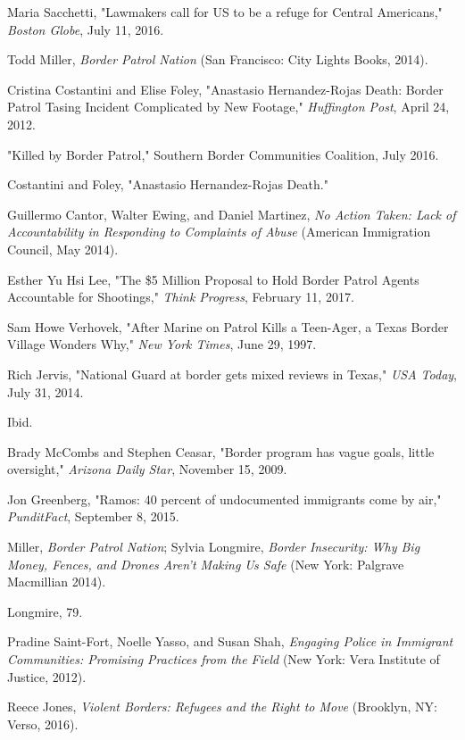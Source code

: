 \documentclass[fontset=fandol, a4paper, 12pt, openright]{ctexbook}
\begin{document}
\begin{enumerate}[label={[\arabic*]}]
    \item Maria Sacchetti, "Lawmakers call for US to be a refuge for Central Americans," \textit{Boston Globe}, July 11, 2016.
    \item Todd Miller, \textit{Border Patrol Nation} (San Francisco: City Lights Books, 2014).
    \item Cristina Costantini and Elise Foley, "Anastasio Hernandez-Rojas Death: Border Patrol Tasing Incident Complicated by New Footage," \textit{Huffington Post}, April 24, 2012.
    \item "Killed by Border Patrol," Southern Border Communities Coalition, July 2016.
    \item Costantini and Foley, "Anastasio Hernandez-Rojas Death."
    \item Guillermo Cantor, Walter Ewing, and Daniel Martinez, \textit{No Action Taken: Lack of Accountability in Responding to Complaints of Abuse} (American Immigration Council, May 2014).
    \item Esther Yu Hsi Lee, "The \$5 Million Proposal to Hold Border Patrol Agents Accountable for Shootings," \textit{Think Progress}, February 11, 2017.
    \item Sam Howe Verhovek, "After Marine on Patrol Kills a Teen-Ager, a Texas Border Village Wonders Why," \textit{New York Times}, June 29, 1997.
    \item Rich Jervis, "National Guard at border gets mixed reviews in Texas," \textit{USA Today}, July 31, 2014.
    \item Ibid.
    \item Brady McCombs and Stephen Ceasar, "Border program has vague goals, little oversight," \textit{Arizona Daily Star}, November 15, 2009.
    \item Jon Greenberg, "Ramos: 40 percent of undocumented immigrants come by air," \textit{PunditFact}, September 8, 2015.
    \item Miller, \textit{Border Patrol Nation}; Sylvia Longmire, \textit{Border Insecurity: Why Big Money, Fences, and Drones Aren't Making Us Safe} (New York: Palgrave Macmillian 2014).
    \item Longmire, 79.
    \item Pradine Saint-Fort, Noelle Yasso, and Susan Shah, \textit{Engaging Police in Immigrant Communities: Promising Practices from the Field} (New York: Vera Institute of Justice, 2012).
    \item Reece Jones, \textit{Violent Borders: Refugees and the Right to Move} (Brooklyn, NY: Verso, 2016).

\end{enumerate}
\end{document}
